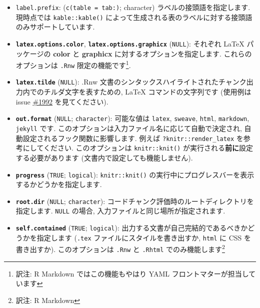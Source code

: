 \documentclass[
  lualatex,ja=standard,jafont=noto-otf]{bxjsreport}
\begin{document}
\begin{itemize}
  LaTeX プリアンブルや HTML
  ヘッダでコマンドやスタイルの定義をするのに有用です.
  ドキュメントの開始地点は
  \texttt{knitr::knit\_patterns\$get(\textquotesingle{}document.begin\textquotesingle{})}
  で知ることができます. このオプションは \texttt{.Rnw} と
  \texttt{.Rhtml} 限定の機能です\footnote{訳注: R Markdown
    ではヘッダの設定は YAML フロントマターで行います}.
\item
  \texttt{label.prefix}:
  (\texttt{c(table\ =\ \textquotesingle{}tab:\textquotesingle{})};
  character) ラベルの接頭語を指定します. 現時点では
  \texttt{kable::kable()}
  によって生成される表のラベルに対する接頭語のみサポートしています.
\item
  \textbf{\texttt{latex.options.color}},
  \textbf{\texttt{latex.options.graphicx}} (\texttt{NULL}): それぞれ
  LaTeX パッケージの \textbf{color} と \textbf{graphicx}
  に対するオプションを指定します. これらのオプションは \texttt{.Rnw}
  限定の機能です\footnote{訳注: R Markdown ではこの機能もやはり YAML
    フロントマターが担当しています}.
\item
  \textbf{\texttt{latex.tilde}} (\texttt{NULL}): .Rnw
  文書のシンタックスハイライトされたチャンク出力内でのチルダ文字を表すための,
  LaTeX コマンドの文字列です (使用例は issue
  \href{https://github.com/yihui/knitr/issues/1992}{\#1992}
  を見てください).
\item
  \textbf{\texttt{out.format}} (\texttt{NULL}; \texttt{character}):
  可能な値は \texttt{latex}, \texttt{sweave}, \texttt{html},
  \texttt{markdown}, \texttt{jekyll} です.
  このオプションは入力ファイル名に応じて自動で決定され,
  自動設定されるフック関数に影響します. 例えば
  \texttt{?knitr::render\_latex} を参考にしてください. このオプションは
  \texttt{knitr::knit()} が実行される\textbf{前に}設定する必要があります
  (文書内で設定しても機能しません).
\item
  \textbf{\texttt{progress}} (\texttt{TRUE}; \texttt{logical}):
  \texttt{knitr::knit()}
  の実行中にプログレスバーを表示するかどうかを指定します.
\item
  \textbf{\texttt{root.dir}} (\texttt{NULL}; \texttt{character}):
  コードチャンク評価時のルートディレクトリを指定します. \texttt{NULL}
  の場合, 入力ファイルと同じ場所が指定されます.
\item
  \textbf{\texttt{self.contained}} (\texttt{TRUE}; \texttt{logical}):
  出力する文書が自己完結的であるべきかどうかを指定します (\texttt{.tex}
  ファイルにスタイルを書き出すか, \texttt{html} に CSS を書き出すか).
  このオプションは \texttt{.Rnw} と \texttt{.Rhtml}
  でのみ機能します\footnote{訳注: R Markdown
}
\end{itemize}
\end{document}
